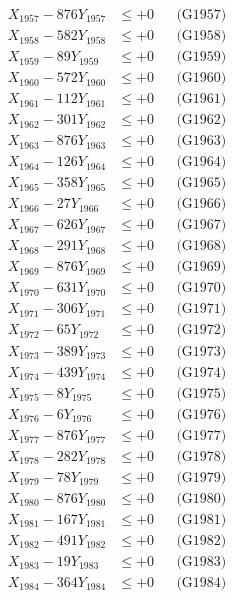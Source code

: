 \documentclass[a4paper,10pt]{article}
\begin{document}
{\begin{align}
X_{1957} - 876Y_{1957} &\leq +0 && \text{(G1957)} \\
X_{1958} - 582Y_{1958} &\leq +0 && \text{(G1958)} \\
X_{1959} - 89Y_{1959} &\leq +0 && \text{(G1959)} \\
X_{1960} - 572Y_{1960} &\leq +0 && \text{(G1960)} \\
\allowbreak
X_{1961} - 112Y_{1961} &\leq +0 && \text{(G1961)} \\
X_{1962} - 301Y_{1962} &\leq +0 && \text{(G1962)} \\
X_{1963} - 876Y_{1963} &\leq +0 && \text{(G1963)} \\
X_{1964} - 126Y_{1964} &\leq +0 && \text{(G1964)} \\
X_{1965} - 358Y_{1965} &\leq +0 && \text{(G1965)} \\
X_{1966} - 27Y_{1966} &\leq +0 && \text{(G1966)} \\
X_{1967} - 626Y_{1967} &\leq +0 && \text{(G1967)} \\
X_{1968} - 291Y_{1968} &\leq +0 && \text{(G1968)} \\
X_{1969} - 876Y_{1969} &\leq +0 && \text{(G1969)} \\
X_{1970} - 631Y_{1970} &\leq +0 && \text{(G1970)} \\
\allowbreak
X_{1971} - 306Y_{1971} &\leq +0 && \text{(G1971)} \\
X_{1972} - 65Y_{1972} &\leq +0 && \text{(G1972)} \\
X_{1973} - 389Y_{1973} &\leq +0 && \text{(G1973)} \\
X_{1974} - 439Y_{1974} &\leq +0 && \text{(G1974)} \\
X_{1975} - 8Y_{1975} &\leq +0 && \text{(G1975)} \\
X_{1976} - 6Y_{1976} &\leq +0 && \text{(G1976)} \\
X_{1977} - 876Y_{1977} &\leq +0 && \text{(G1977)} \\
X_{1978} - 282Y_{1978} &\leq +0 && \text{(G1978)} \\
X_{1979} - 78Y_{1979} &\leq +0 && \text{(G1979)} \\
X_{1980} - 876Y_{1980} &\leq +0 && \text{(G1980)} \\
\allowbreak
X_{1981} - 167Y_{1981} &\leq +0 && \text{(G1981)} \\
X_{1982} - 491Y_{1982} &\leq +0 && \text{(G1982)} \\
X_{1983} - 19Y_{1983} &\leq +0 && \text{(G1983)} \\
X_{1984} - 364Y_{1984} &\leq +0 && \text{(G1984)} \\

\end{align}}
\end{document}
